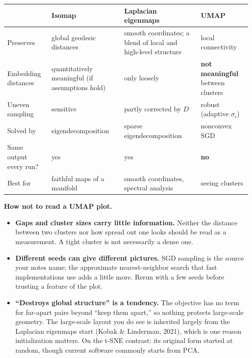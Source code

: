 \documentclass[11pt]{article}
\begin{document}
\begin{center}
\renewcommand{\arraystretch}{1.3}
\small
\begin{tabular}{>{\raggedright\arraybackslash}p{2.9cm}>{\raggedright\arraybackslash}p{3.3cm}>{\raggedright\arraybackslash}p{3.3cm}>{\raggedright\arraybackslash}p{3.7cm}}
\toprule
& Isomap & Laplacian eigenmaps & UMAP\\
\midrule
Preserves & global geodesic distances & smooth coordinates; a blend of local and high-level structure & local connectivity\\
Embedding distances & quantitatively meaningful (if assumptions hold) & only loosely & \textbf{not meaningful} between clusters\\
Uneven sampling & sensitive & partly corrected by $D$ & robust (adaptive $\sigma_i$)\\
Solved by & eigendecomposition & sparse eigendecomposition & nonconvex SGD\\
Same output every run? & yes & yes & \textbf{no}\\
Best for & faithful maps of a manifold & smooth coordinates, spectral analysis & seeing clusters\\
\bottomrule
\end{tabular}
\end{center}

\begin{careful}
\textbf{How not to read a UMAP plot.}
\begin{itemize}[nosep,leftmargin=*]
\item \textbf{Gaps and cluster sizes carry little information.} Neither the distance between two clusters nor how spread out one looks should be read as a measurement. A tight cluster is not necessarily a dense one.
\item \textbf{Different seeds can give different pictures.} SGD sampling is the source your notes name; the approximate nearest-neighbor search that fast implementations use adds a little more. Rerun with a few seeds before trusting a feature of the plot.
\item \textbf{``Destroys global structure'' is a tendency.} The objective has no term for far-apart pairs beyond ``keep them apart,'' so nothing protects large-scale geometry. The large-scale layout you do see is inherited largely from the Laplacian eigenmaps start (Kobak \& Linderman, 2021), which is one reason initialization matters.
On the t-SNE contrast: its original form started at random, though current software commonly starts from PCA.
\end{itemize}
\end{careful}
\end{document}
